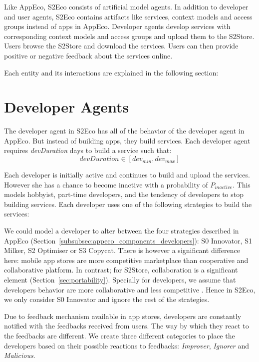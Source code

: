 Like AppEco, S2Eco consists of artificial model agents. In addition to developer and user agents, S2Eco contains artifacts like services, context models and access groups instead of apps in AppEco. Developer agents develop services with corresponding context models and access groups and upload them to the S2Store. Users browse the S2Store and download the services. Users can then provide positive or negative feedback about the services online.

Each entity and its interactions are explained in the following section:

\section{Developer Agents}

The developer agent in S2Eco has all of the behavior of the developer agent in AppEco. But instead of building apps, they build services. Each developer agent requires \emph{devDuration} days to build a service such that: $$devDuration \in [dev_{min}, dev_{max}]$$

Each developer is initially active and continues to build and upload the services. However she has a chance to become inactive with a probability of $P_{inactive}$. This models hobbyist, part-time developers, and the tendency of developers to stop building services. Each developer uses one of the following strategies to build the services:

We could model a developer to alter between the four strategies described in AppEco (Section~\ref{subsubsec:appeco_components_developers}): S0 Innovator, S1 Milker, S2 Optimiser or S3 Copycat. There is however a significant difference here: mobile app stores are more competitive marketplace than cooperative and collaborative platform. In contrast; for S2Store, collaboration is a significant element (Section~\ref{sec:portability}). Specially for developers, we assume that developers behavior are more collaborative and less competitive \cite{dabbish2012social}. Hence in S2Eco, we only consider S0 Innovator and ignore the rest of the strategies.

Due to feedback mechanism available in app stores, developers are constantly notified with the feedbacks received from users. The way by which they react to the feedbacks are different. We create three different categories to place the developers based on their possible reactions to feedbacks: \emph{Improver}, \emph{Ignorer} and \emph{Malicious}.

